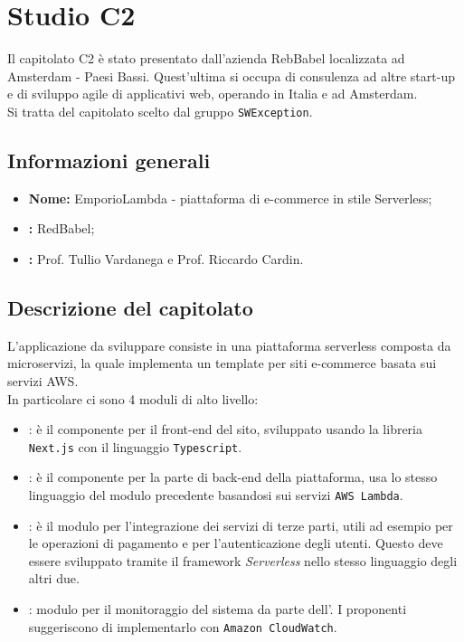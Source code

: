 \section{Studio C2} \label{_c2}
Il capitolato C2 è stato presentato dall'azienda RebBabel localizzata ad Amsterdam - Paesi Bassi. Quest'ultima si occupa di consulenza ad altre start-up e di sviluppo agile di applicativi web, operando in Italia e ad Amsterdam.\\
Si tratta del capitolato scelto dal gruppo \verb|SWException|.

\subsection{Informazioni generali}
\begin{itemize}
	\item \textbf{Nome:} EmporioLambda - piattaforma di e-commerce in stile Serverless;
	\item \textbf{:} RedBabel;
	\item \textbf{:} Prof. Tullio Vardanega e Prof. Riccardo Cardin.
\end{itemize}

\subsection{Descrizione del capitolato}
L'applicazione da sviluppare consiste in una piattaforma serverless composta da microservizi, la quale implementa un template per siti e-commerce basata sui servizi AWS.\\
In particolare ci sono 4 moduli di alto livello:
\begin{itemize}
	\item {}: è il componente per il front-end del sito, sviluppato usando la libreria \verb|Next.js| con il linguaggio \verb|Typescript|.
	\item {}: è il componente per la parte di back-end della piattaforma, usa lo stesso linguaggio del modulo precedente basandosi sui servizi \verb|AWS Lambda|.
	\item {}: è il modulo per l'integrazione dei servizi di terze parti, utili ad esempio per le operazioni di pagamento e per l'autenticazione degli utenti. Questo deve essere sviluppato tramite il framework \textit{Serverless} nello stesso linguaggio degli altri due.
	\item {}: modulo per il monitoraggio del sistema da parte dell'. I proponenti suggeriscono di implementarlo con \verb|Amazon CloudWatch|.
\end{itemize}

